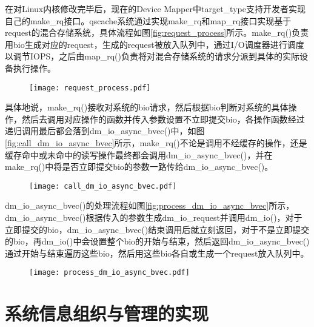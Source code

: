 在对Linux内核修改完毕后，现在的Device Mapper中target\_type支持开发者实现自己的make\_rq接口。qscache系统通过实现make\_rq和map\_rq接口实现基于request的混合存储系统，具体流程如图\ref{fig:request_process}所示。make\_rq()负责用bio生成对应的request，生成的request被放入队列中，通过I/O调度器进行调度以调节IOPS，之后由map\_rq()负责将对混合存储系统的请求分派到具体的实际设备执行操作。

\begin{figure}[!htbp]
    \centering
    \texttt{[image: request\_process.pdf]}


\end{figure}

具体地说，make\_rq()接收对系统的bio请求，然后根据bio判断对系统的具体操作，然后去调用对应操作的函数并传入参数设置不立即提交bio，各操作函数经过递归调用最后都会落到dm\_io\_async\_bvec()中，如图\ref{fig:call_dm_io_async_bvec}所示，make\_rq()不论是调用不经缓存的操作，还是缓存命中或未命中的读写操作最终都会调用dm\_io\_async\_bvec()，并在make\_rq()中将是否立即提交bio的参数一路传给dm\_io\_async\_bvec()。

\begin{figure}[H]
    \centering
    \texttt{[image: call\_dm\_io\_async\_bvec.pdf]}

    \vskip -0.5cm

\end{figure}

dm\_io\_async\_bvec()的处理流程如图\ref{fig:process_dm_io_async_bvec}所示，dm\_io\_async\_bvec()根据传入的参数生成dm\_io\_request并调用dm\_io()，对于立即提交的bio，dm\_io\_async\_bvec()结束调用后就立刻返回，对于不是立即提交的bio，再dm\_io()中会设置整个bio的开始与结束，然后返回dm\_io\_async\_bvec()通过开始与结束遍历这些bio，然后用这些bio各自或生成一个request放入队列中。

\begin{figure}[!htbp]
    \centering
    \texttt{[image: process\_dm\_io\_async\_bvec.pdf]}
\end{figure}

\section{系统信息组织与管理的实现}

